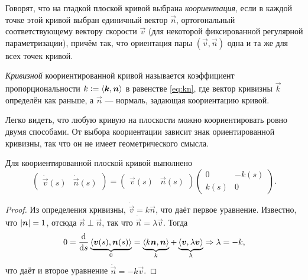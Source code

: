 \begin{definition}
	Говорят, что на гладкой плоской кривой выбрана \textit{коориентация}, если в каждой точке этой кривой выбран единичный вектор $\vec{n}$, ортогональный соответствующему вектору скорости $\vec{v}$ (для некоторой фиксированной регулярной параметризации), причём так, что ориентация пары $(\vec{v}, \vec{n})$ одна и та же для всех точек кривой\footnotemark{}.
\end{definition}


\begin{definition}
	\textit{Кривизной} коориентированной кривой называется коэффициент пропорциональности $k \vcentcolon = \langle\vec{k}, \vec{n}\rangle$ в равенстве \eqref{eq:kn}, где вектор кривизны $\vec{k}$ определён как раньше, а $\vec{n}$ --- нормаль, задающая коориентацию кривой.
\end{definition}

Легко видеть, что любую кривую на плоскости можно коориентировать ровно двумя способами. От выбора коориентации зависит знак ориентированной кривизны, так что он не имеет геометрического смысла.

\begin{theorem}
	Для коориентированной плоской кривой выполнено
	\begin{equation} \label{eq:PlaneFrenet}
		\begin{pmatrix}
			\dot{\vec{v}}(s) & \dot{\vec{n}}(s)
		\end{pmatrix} = 
		\begin{pmatrix}
			\vec{v}(s) & \vec{n}(s)
		\end{pmatrix}
		\begin{pmatrix}
			0 & -k(s)\\
			k(s) & 0
		\end{pmatrix}.
	\end{equation}
\end{theorem}

\begin{proof}
	Из определения кривизны, $\dot{\vec{v}} = k\vec{n}$, что даёт первое уравнение. Известно, что $\abs{\vec{n}} = 1$, отсюда $\vec{n} \perp \dot{\vec{n}}$, так что $\dot{\vec{n}} = \lambda\vec{v}$. Тогда
	\[
		0 = \frac{\d}{\d s}\underbrace{\langle \vec{v}(s), \vec{n}(s)\rangle}_{0} = \underbrace{\langle k\vec{n}, \vec{n}\rangle}_{k} + \underbrace{\langle \vec{v}, \lambda\vec{v} \rangle}_{\lambda} \Rightarrow \lambda = -k,
	\]
	что даёт и второе уравнение $\dot{\vec{n}} = -k\vec{v}$.
\end{proof}

